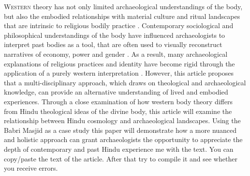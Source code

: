 \lettrine[nindent=0em,lines=3]{W}{estern} theory has not only limited archaeological understandings of the body, but also the embodied relationships with material culture and ritual landscapes that are intrinsic to religious bodily practice \parencite{Hamilakis_2002, Insoll_2004}. Contemporary sociological and philosophical understandings of the body \parencites{Bourdieu_1977}{Foucault_1977} have influenced archaeologists to interpret past bodies as a tool, that are often used to visually reconstruct narratives of economy, power and gender \parencites{Barrett_1994}{Shanks_1987}. As a result, many archaeological explanations of religious practices and identity have become rigid through the application of a purely western interpretation \parencites{Edwards_2005}{Insoll_2004} . However, this article proposes that a multi-disciplinary approach, which draws on theological and archaeological knowledge, can provide an alternative understanding of lived and embodied experiences. Through a close examination of how western body theory differs from Hindu theological ideas of the divine body, this article will examine the relationship between Hindu cosmology and archaeological landscapes. Using the Babri Masjid as a case study this paper will demonstrate how a more nuanced and holistic approach can grant archaeologists the opportunity to appreciate the depth of contemporary and past Hindu experience  me with the text. You can copy/paste the text of the article. After that try to compile it and see whether you receive errors.
	
